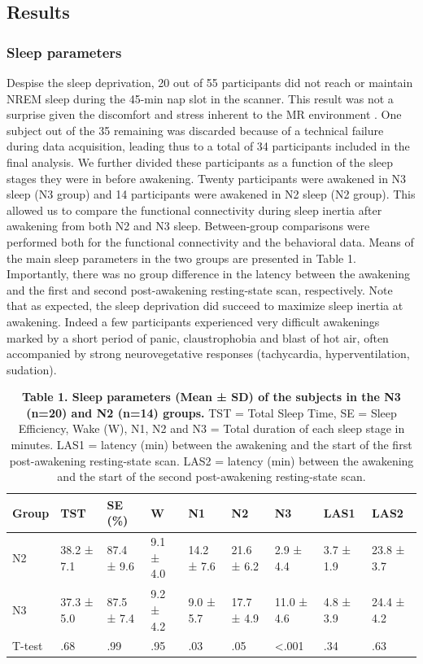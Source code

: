 \subsection*{Results}
\label{res:inertia:inertia:results}

\subsubsection*{Sleep parameters}
Despise the sleep deprivation, 20 out of 55 participants did not reach or maintain NREM sleep during the 45-min nap slot in the scanner. This result was not a surprise given the discomfort and stress inherent to the MR environment \citep{duyn_eeg-fmri_2012}. One subject out of the 35 remaining was discarded because of a technical failure during data acquisition, leading thus to a total of 34 participants included in the final analysis. We further divided these participants as a function of the sleep stages they were in before awakening. Twenty participants were awakened in N3 sleep (N3 group) and 14 participants were awakened in N2 sleep (N2 group). This allowed us to compare the functional connectivity during sleep inertia after awakening from both N2 and N3 sleep. Between-group comparisons were performed both for the functional connectivity and the behavioral data. Means of the main sleep parameters in the two groups are presented in Table 1. Importantly, there was no group difference in the latency between the awakening and the first and second post-awakening resting-state scan, respectively. Note that as expected, the sleep deprivation did succeed to maximize sleep inertia at awakening. Indeed a few participants experienced very difficult awakenings marked by a short period of panic, claustrophobia and blast of hot air, often accompanied by strong neurovegetative responses (tachycardia, hyperventilation, sudation).

\begin{table}[htb]
    \caption*{\textbf{Table 1. Sleep parameters (Mean ± SD) of the subjects in the N3 (n=20) and N2 (n=14) groups.} TST = Total Sleep Time, SE = Sleep Efficiency, Wake (W), N1, N2 and N3 = Total duration of each sleep stage in minutes. LAS1 = latency (min) between the awakening and the start of the first post-awakening resting-state scan. LAS2 = latency (min) between the awakening and the start of the second post-awakening resting-state scan.}
    \begin{tabularx}{\textwidth}{XXXXXXXXX}
    \toprule
    Group  & TST        & SE (\%)       & W         & N1         & N2         & N3          & LAS1      & LAS2 \\ \midrule
    N2     & 38.2 ± 7.1 & 87.4 ± 9.6    & 9.1 ± 4.0 & 14.2 ± 7.6 & 21.6 ± 6.2 & 2.9 ± 4.4   & 3.7 ± 1.9 & 23.8 ± 3.7 \\
    N3     & 37.3 ± 5.0 & 87.5 ± 7.4    & 9.2 ± 4.2 & 9.0 ± 5.7  & 17.7 ± 4.9 & 11.0 ± 4.6  & 4.8 ± 3.9 & 24.4 ± 4.2 \\
    T-test & .68        & .99           & .95       & .03        & .05        & <.001       & .34       & .63 \\ \bottomrule
    \end{tabularx}%
\end{table}

